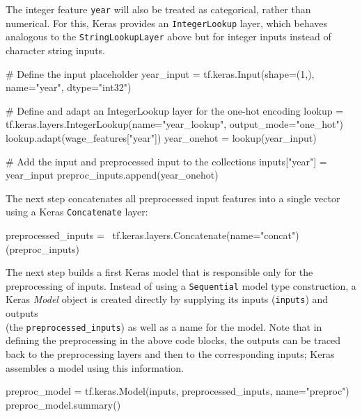The integer feature \texttt{year} will also be treated as categorical, rather than numerical. For this, Keras provides an \texttt{IntegerLookup} layer, which behaves analogous to the \texttt{StringLookupLayer} above but for integer inputs instead of character string inputs.

\begin{samepage}
\begin{pythoncode}
# Define the input placeholder
year_input = tf.keras.Input(shape=(1,), name="year", dtype="int32")

# Define and adapt an IntegerLookup layer for the one-hot encoding
lookup = tf.keras.layers.IntegerLookup(name="year_lookup",
                                       output_mode="one_hot")
lookup.adapt(wage_features["year"])
year_onehot = lookup(year_input)

# Add the input and preprocessed input to the collections
inputs["year"] = year_input
preproc_inputs.append(year_onehot)
\end{pythoncode}
\end{samepage}

The next step concatenates all preprocessed input features into a single vector using a Keras \texttt{Concatenate} layer:

\begin{samepage}
\begin{pythoncode}
preprocessed_inputs = \
    tf.keras.layers.Concatenate(name="concat")(preproc_inputs)
\end{pythoncode}
\end{samepage}

The next step builds a first Keras model that is responsible only for the preprocessing of inputs. Instead of using a \texttt{Sequential} model type construction, a Keras \emph{Model} object is created directly by supplying its inputs (\texttt{inputs}) and outputs \\(the \texttt{preprocessed\_inputs}) as well as a name for the model. Note that in defining the preprocessing in the above code blocks, the outputs can be traced back to the preprocessing layers and then to the corresponding inputs; Keras assembles a model using this information.

\begin{samepage}
\begin{pythoncode}
preproc_model = tf.keras.Model(inputs, 
                               preprocessed_inputs,
                               name="preproc")
preproc_model.summary()
\end{pythoncode}
\end{samepage}

